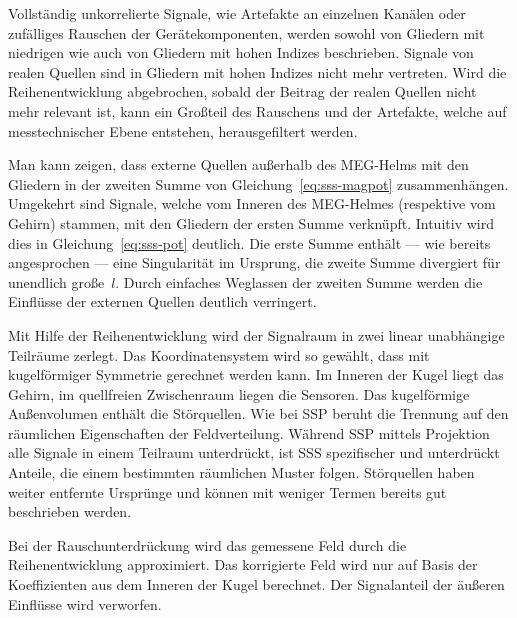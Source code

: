 \documentclass[doc,a4paper,12pt]{apa6}
\begin{document}
\begin{compactitem}
\item Vollständig unkorrelierte Signale, wie Artefakte an einzelnen Kanälen oder zufälliges Rauschen der Gerätekomponenten, werden sowohl von Gliedern mit niedrigen wie auch von Gliedern mit hohen Indizes beschrieben. Signale von realen Quellen sind in Gliedern mit hohen Indizes nicht mehr vertreten. Wird die Reihenentwicklung abgebrochen, sobald der Beitrag der realen Quellen nicht mehr relevant ist, kann ein Großteil des Rauschens und der Artefakte, welche auf messtechnischer Ebene entstehen, herausgefiltert werden.
\item Man kann zeigen, dass externe Quellen außerhalb des MEG-Helms mit den Gliedern in der zweiten Summe von Gleichung~\ref{eq:sss-magpot} zusammenhängen. Umgekehrt sind Signale, welche vom Inneren des MEG-Helmes (respektive vom Gehirn) stammen, mit den Gliedern der ersten Summe verknüpft. Intuitiv wird dies in Gleichung~\ref{eq:sss-pot} deutlich. Die erste Summe enthält --- wie bereits angesprochen --- eine Singularität im Ursprung, die zweite Summe divergiert für unendlich große~$l$. Durch einfaches Weglassen der zweiten Summe werden die Einflüsse der externen Quellen deutlich verringert.
\end{compactitem}

Mit Hilfe der Reihenentwicklung wird der Signalraum in zwei linear unabhängige Teilräume zerlegt. Das Koordinatensystem wird so gewählt, dass mit kugelförmiger Symmetrie gerechnet werden kann. Im Inneren der Kugel liegt das Gehirn, im quellfreien Zwischenraum liegen die Sensoren. Das kugelförmige Außenvolumen enthält die Störquellen. Wie bei SSP beruht die Trennung auf den räumlichen Eigenschaften der Feldverteilung. Während SSP mittels Projektion alle Signale in einem Teilraum unterdrückt, ist SSS spezifischer und unterdrückt Anteile, die einem bestimmten räumlichen Muster folgen. Störquellen haben weiter entfernte Ursprünge und können mit weniger Termen bereits gut beschrieben werden.

Bei der Rauschunterdrückung wird das gemessene Feld durch die Reihenentwicklung approximiert. Das korrigierte Feld wird nur auf Basis der Koeffizienten aus dem Inneren der Kugel berechnet. Der Signalanteil der äußeren Einflüsse wird verworfen.

\end{document}
